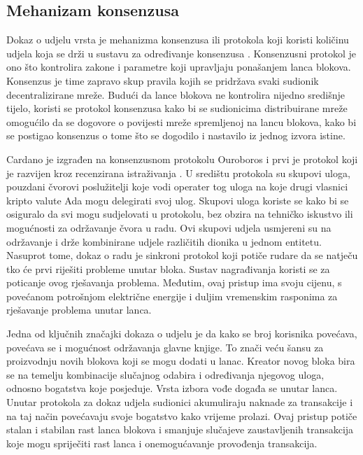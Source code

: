 \documentclass[times, utf8, diplomski]{fer}
\begin{document}
\subsection{Mehanizam konsenzusa}

Dokaz o udjelu vrsta je mehanizma konsenzusa ili protokola koji koristi količinu udjela koja se drži u sustavu za određivanje konsenzusa \cite{king2012ppcoin}. Konsenzusni protokol je ono što kontrolira zakone i parametre koji upravljaju ponašanjem lanca blokova. Konsenzus je time zapravo skup pravila kojih se pridržava svaki sudionik decentralizirane mreže. Budući da lance blokova ne kontrolira nijedno središnje tijelo, koristi se protokol konsenzusa kako bi se sudionicima distribuirane mreže omogućilo da se dogovore o povijesti mreže spremljenoj na lancu blokova, kako bi se postigao konsenzus o tome što se dogodilo i nastavilo iz jednog izvora istine.

Cardano je izgrađen na konsenzusnom protokolu Ouroboros i prvi je protokol koji je razvijen kroz recenzirana istraživanja \cite{kiayias2017ouroboros}. U središtu protokola su skupovi uloga, pouzdani čvorovi poslužitelji koje vodi operater tog uloga na koje drugi vlasnici kripto valute Ada mogu delegirati svoj ulog. Skupovi uloga koriste se kako bi se osiguralo da svi mogu sudjelovati u protokolu, bez obzira na tehničko iskustvo ili mogućnosti za održavanje čvora u radu. Ovi skupovi udjela usmjereni su na održavanje i drže kombinirane udjele različitih dionika u jednom entitetu. Nasuprot tome, dokaz o radu je sinkroni protokol koji potiče rudare da se natječu tko će prvi riješiti probleme unutar bloka. Sustav nagrađivanja koristi se za poticanje ovog rješavanja problema. Međutim, ovaj pristup ima svoju cijenu, s povećanom potrošnjom električne energije i duljim vremenskim rasponima za rješavanje problema unutar lanca.

Jedna od ključnih značajki dokaza o udjelu je da kako se broj korisnika povećava, povećava se i mogućnost održavanja glavne knjige. To znači veću šansu za proizvodnju novih blokova koji se mogu dodati u lanac. Kreator novog bloka bira se na temelju kombinacije slučajnog odabira i određivanja njegovog uloga, odnosno bogatstva koje posjeduje. Vrsta izbora vođe događa se unutar lanca. Unutar protokola za dokaz udjela sudionici akumuliraju naknade za transakcije i na taj način povećavaju svoje bogatstvo kako vrijeme prolazi. Ovaj pristup potiče stalan i stabilan rast lanca blokova i smanjuje slučajeve zaustavljenih transakcija koje mogu spriječiti rast lanca i onemogućavanje provođenja transakcija. 
\end{document}
